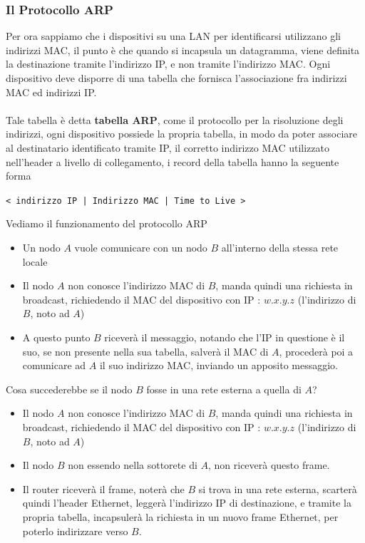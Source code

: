 \documentclass[12pt, letterpaper]{article}
\newcommand{\codee}[1]{\colorbox{white}{\texttt{#1}}}
\newcommand{\acc}{\\\hphantom{}\\}
\begin{document}
\subsubsection{Il Protocollo ARP}
Per ora sappiamo che i dispositivi su una LAN per identificarsi utilizzano gli indirizzi MAC, il punto è che quando 
si incapsula un datagramma, viene definita la destinazione tramite l'indirizzo IP, e non tramite l'indirizzo MAC. Ogni 
dispositivo deve disporre di una tabella che fornisca l'associazione fra indirizzi MAC ed indirizzi IP. \acc 
Tale tabella è detta \textbf{tabella ARP}, come il protocollo per la risoluzione degli indirizzi, ogni dispositivo 
possiede la propria tabella, in modo da poter associare al destinatario identificato tramite IP, il corretto 
indirizzo MAC utilizzato nell'header a livello di collegamento, i record della tabella hanno la seguente forma 
\begin{center}
    \codee{\Big< indirizzo IP \Big| Indirizzo MAC \Big| Time to Live \Big>}
\end{center}
Vediamo il funzionamento del protocollo ARP\begin{itemize}
    \item Un nodo $A$ vuole comunicare con un nodo $B$ all'interno della stessa rete locale 
    \item Il nodo $A$ non conosce l'indirizzo MAC di $B$, manda quindi una richiesta in broadcast, 
    richiedendo il MAC del dispositivo con IP : $w.x.y.z$ (l'indirizzo di $B$, noto ad $A$)
    \item A questo punto $B$ riceverà il messaggio, notando che l'IP in questione è il suo, se non presente 
    nella sua tabella, salverà il MAC di $A$, procederà poi a comunicare ad $A$ il suo indirizzo MAC, inviando 
    un apposito messaggio.
\end{itemize}
Cosa succederebbe se il nodo $B$ fosse in una rete esterna a quella di $A$?\begin{itemize}
    \item Il nodo $A$ non conosce l'indirizzo MAC di $B$, manda quindi una richiesta in broadcast, 
    richiedendo il MAC del dispositivo con IP : $w.x.y.z$ (l'indirizzo di $B$, noto ad $A$)
    \item Il nodo $B$ non essendo nella sottorete di $A$, non riceverà questo frame. 
    \item Il router riceverà il frame, noterà che $B$ si trova in una rete esterna, scarterà quindi 
    l'header Ethernet, leggerà l'indirizzo IP di destinazione, e tramite la propria tabella, 
    incapsulerà la richiesta in un nuovo frame Ethernet, per poterlo indirizzare verso $B$. 
\end{itemize}
\end{document}
